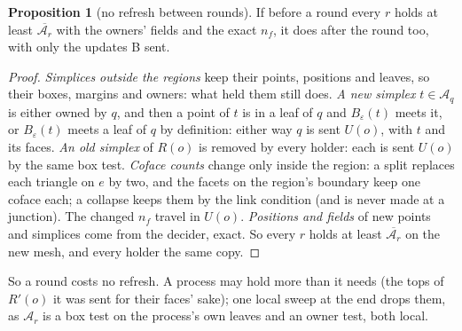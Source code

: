\documentclass[10pt,a4paper]{article}
\theoremstyle{definition}
\newtheorem{proposition}{Proposition}
\begin{document}
\begin{proposition}[no refresh between rounds]
  \label{prop:noref}
  If before a round every $r$ holds at least $\overline{\mathcal{A}_r}$
  with the owners' fields and the exact $n_f$, it does after the round
  too, with only the updates B sent.
\end{proposition}
\begin{proof}
  \emph{Simplices outside the regions} keep their points, positions and
  leaves, so their boxes, margins and owners: what held them still does.
  \emph{A new simplex} $t \in \mathcal{A}_q$ is either owned by $q$, and
  then a point of $t$ is in a leaf of $q$ and $B_\varepsilon(t)$ meets it,
  or $B_\varepsilon(t)$ meets a leaf of $q$ by definition: either way $q$
  is sent $U(o)$, with $t$ and its faces. \emph{An old simplex} of $R(o)$
  is removed by every holder: each is sent $U(o)$ by the same box test.
  \emph{Coface counts} change only inside the region: a split replaces
  each triangle on $e$ by two, and the facets on the region's boundary
  keep one coface each; a collapse keeps them by the link condition (and
  is never made at a junction). The changed $n_f$ travel in $U(o)$.
  \emph{Positions and fields} of new points and simplices come from the
  decider, exact. So every $r$ holds at least $\overline{\mathcal{A}_r}$
  on the new mesh, and every holder the same copy.
\end{proof}

So a round costs no refresh. A process may hold more than it needs (the
tops of $R'(o)$ it was sent for their faces' sake); one local sweep at the
end drops them, as $\mathcal{A}_r$ is a box test on the process's own
leaves and an owner test, both local.
\end{document}
